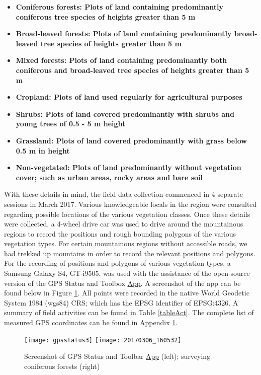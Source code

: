 \begin{itemize}
	\item [1. ] \bfseries Coniferous forests: \rm Plots of land containing predominantly coniferous tree species of heights greater than 5 m
	\item [2. ]\bfseries Broad-leaved forests: \rm Plots of land containing predominantly broad-leaved tree species of heights greater than 5 m
	\item [3. ]\bfseries Mixed forests: \rm Plots of land containing predominantly both coniferous and broad-leaved tree species of heights greater than 5 m
	\item [4. ]\bfseries Cropland: \rm Plots of land used regularly for agricultural purposes
	\item [5. ]\bfseries Shrubs: \rm Plots of land covered predominantly with shrubs and young trees of 0.5 - 5 m height
	\item [6. ]\bfseries Grassland: \rm Plots of land covered predominantly with grass below 0.5 m in height
	\item [7. ]\bfseries Non-vegetated: \rm Plots of land predominantly without vegetation cover; such as urban areas, rocky areas and bare soil
\end{itemize}

\justify
With these details in mind, the field data collection commenced in 4 separate sessions in March 2017. Various knowledgeable locals in the region were consulted regarding possible locations of the various vegetation classes. Once these details were collected, a 4-wheel drive car was used to drive around the mountainous regions to record the positions and rough bounding polygons of the various vegetation types. For certain mountainous regions without accessible roads, we had trekked up mountains in order to record the relevant positions and polygons. For the recording of positions and polygons of various vegetation types, a Samsung Galaxy S4, GT-i9505, was used with the assistance of the open-source version of the GPS Status and Toolbox \href{https://play.google.com/store/apps/details?id=com.eclipsim.gpsstatus2}{App}. A screenshot of the app can be found below in Figure \ref{fig12}. All points were recorded in the native World Geodetic System 1984 (\ac{wgs84}) CRS; which has the EPSG identifier of EPSG:4326. A summary of field activities can be found in Table \ref{tableAct}. The complete list of measured GPS coordinates can be found in Appendix \hyperref[app4]{1}. 

\begin{figure}[H]
	\centering
	\texttt{[image: gpsstatus3]}
	\texttt{[image: 20170306\_160532]} \\
	\vspace{0.2cm}
	\caption{Screenshot of GPS Status and Toolbar \href{http://pagasa.jp/wp-content/uploads/2015/07/gpsstatus3.png}{App} (left); surveying coniferous forests (right)}\label{fig12}
\end{figure}

